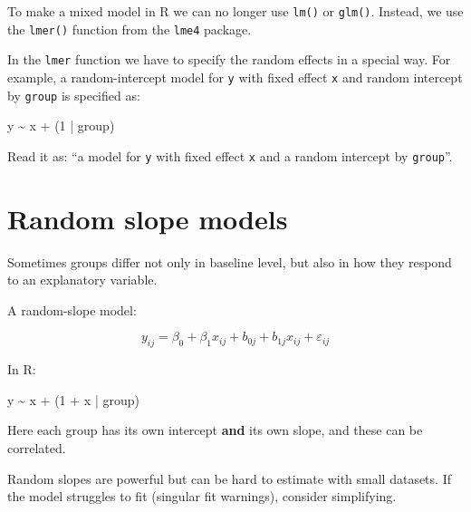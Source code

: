 \documentclass[
  letterpaper,
  8pt,
  a4paper]{book}
\newenvironment{Shaded}{\begin{snugshade}}{\end{snugshade}}
\newcommand{\DecValTok}[1]{\textcolor[rgb]{0.68,0.00,0.00}{#1}}
\newcommand{\NormalTok}[1]{\textcolor[rgb]{0.00,0.23,0.31}{#1}}
\newcommand{\SpecialCharTok}[1]{\textcolor[rgb]{0.37,0.37,0.37}{#1}}
\begin{document}
To make a mixed model in R we can no longer use \texttt{lm()} or
\texttt{glm()}. Instead, we use the \texttt{lmer()} function from the
\texttt{lme4} package.

In the \texttt{lmer} function we have to specify the random effects in a
special way. For example, a random-intercept model for \texttt{y} with
fixed effect \texttt{x} and random intercept by \texttt{group} is
specified as:

\begin{Shaded}
\begin{Highlighting}[]
\NormalTok{y }\SpecialCharTok{\textasciitilde{}}\NormalTok{ x }\SpecialCharTok{+}\NormalTok{ (}\DecValTok{1} \SpecialCharTok{|}\NormalTok{ group)}
\end{Highlighting}
\end{Shaded}

Read it as: ``a model for \texttt{y} with fixed effect \texttt{x} and a
random intercept by \texttt{group}''.

\section*{Random slope models}\label{random-slope-models}


Sometimes groups differ not only in baseline level, but also in how they
respond to an explanatory variable.

A random-slope model:

\[y_{ij} = \beta_0 + \beta_1 x_{ij} + b_{0j} + b_{1j}x_{ij} + \varepsilon_{ij}\]

In R:

\begin{Shaded}
\begin{Highlighting}[]
\NormalTok{y }\SpecialCharTok{\textasciitilde{}}\NormalTok{ x }\SpecialCharTok{+}\NormalTok{ (}\DecValTok{1} \SpecialCharTok{+}\NormalTok{ x }\SpecialCharTok{|}\NormalTok{ group)}
\end{Highlighting}
\end{Shaded}

Here each group has its own intercept \textbf{and} its own slope, and
these can be correlated.

\begin{tcolorbox}[enhanced jigsaw, arc=.35mm, bottomrule=.15mm, bottomtitle=1mm, breakable, colback=white, colbacktitle=quarto-callout-caution-color!10!white, colframe=quarto-callout-caution-color-frame, coltitle=black, left=2mm, leftrule=.75mm, opacityback=0, opacitybacktitle=0.6, rightrule=.15mm, title=\textcolor{quarto-callout-caution-color}{\faFire}\hspace{0.5em}{Caution}, titlerule=0mm, toprule=.15mm, toptitle=1mm]

Random slopes are powerful but can be hard to estimate with small
datasets. If the model struggles to fit (singular fit warnings),
consider simplifying.

\end{tcolorbox}
\end{document}
